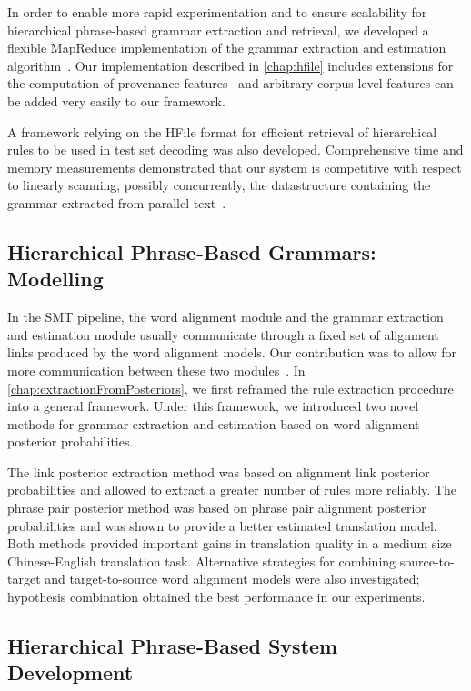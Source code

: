 In order to enable more rapid experimentation and to ensure
scalability for hierarchical phrase-based grammar extraction
and retrieval, we developed a flexible MapReduce implementation
of the grammar extraction and estimation
algorithm~\citep{dyer-cordova-mont-lin:2008:WMT}.
Our implementation described in \autoref{chap:hfile} includes
extensions for the computation
of provenance
features~\citep{chiang-deneefe-pust:2011:ACL} and arbitrary
corpus-level features can be added very easily to our framework.

A framework relying on the HFile format
for efficient retrieval of hierarchical rules to
be used in test set decoding was also developed.
Comprehensive time and memory measurements demonstrated
that our system is competitive with respect to linearly
scanning, possibly concurrently, the datastructure containing
the grammar extracted from parallel
text~\citep{pino-waite-byrne:2012:PBML}.

\subsection{Hierarchical Phrase-Based Grammars: Modelling}

In the SMT pipeline, the word alignment module and
the grammar extraction and estimation module usually
communicate through a fixed set of alignment links
produced by the word alignment models. Our contribution
was to allow for more communication between these two
modules~\citep{degispert-pino-byrne:2010:EMNLP}.
In \autoref{chap:extractionFromPosteriors}, we
first reframed the rule extraction procedure
into a general framework. Under this framework, we
introduced two novel methods for grammar extraction
and estimation based on word alignment posterior
probabilities.

The link posterior extraction method was based on alignment
link posterior probabilities and allowed to extract
a greater number of rules more reliably. The phrase pair
posterior method was based on phrase pair alignment posterior
probabilities and was shown to provide a better estimated
translation model. Both methods provided important gains in
translation quality in
a medium size Chinese-English translation task.
Alternative strategies for combining source-to-target
and target-to-source word alignment models were also
investigated; hypothesis combination obtained the best
performance in our experiments.

\subsection{Hierarchical Phrase-Based System Development}

